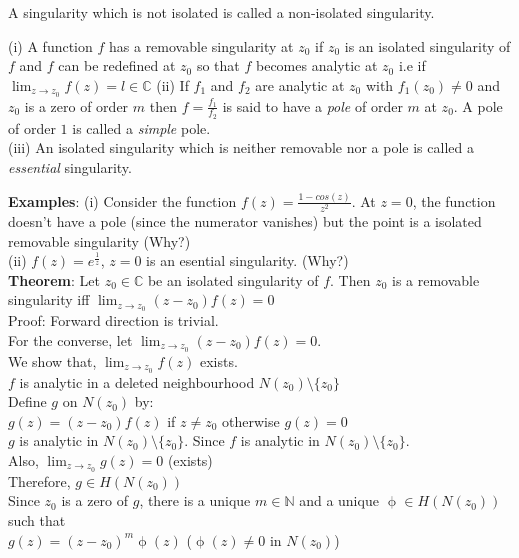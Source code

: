 A singularity which is not isolated is called a non-isolated singularity.\\
\begin{defn}
    (i) A function $f$ has a removable singularity at $z_0$ if $z_0$ is an isolated singularity of $f$ and $f$ can be redefined at $z_0$ so that $f$ becomes analytic at $z_0$ i.e if \\
    $\lim_{z\rightarrow z_0} f(z)=l\in \mathbb{C}$
    (ii)  If $f_1$ and $f_2$ are analytic at $z_0$ with $f_1(z_0)\neq 0$ and $z_0$ is a zero of order $m$ then $f=\frac{f_1}{f_2}$ is said to have a \emph{pole} of order $m$ at $z_0$. A pole of order $1$ is called a \emph{simple} pole.\\
    (iii) An isolated singularity which is neither removable nor a pole is called a \emph{essential} singularity.\\
\end{defn}
\textbf{Examples}: (i) Consider the function $f(z)= \frac{1-cos(z)}{z^2}$. At $z=0$, the function doesn't have a pole (since the numerator vanishes) but the point is a isolated removable singularity (Why?)\\
(ii) $f(z)=e^{\frac{1}{z}}$, $z=0$ is an esential singularity. (Why?)\\
\textbf{Theorem}: Let $z_0\in \mathbb{C}$ be an isolated singularity of $f$. Then $z_0$ is a removable singularity iff $\lim_{z\rightarrow z_0} (z-z_0) f(z)=0$\\
Proof: Forward direction is trivial.\\
For the converse, let $\lim_{z\rightarrow z_0} (z-z_0) f(z)=0$.\\
We show that, $\lim_{z\rightarrow z_0} f(z)$ exists.\\
$f$ is analytic in a deleted neighbourhood $N(z_0)\setminus \{z_0\}$\\
Define $g$ on $N(z_0)$ by: \\
$g(z)= (z-z_0)f(z)$ if $z\neq z_0$ otherwise $g(z)=0$\\
$g$ is analytic in $N(z_0)\setminus \{z_0\}$. Since $f$ is analytic in $N(z_0)\setminus \{z_0\}$. \\
Also, $\lim_{z\rightarrow z_0} g(z)=0$  (exists)\\
Therefore, $g\in H(N(z_0))$\\
Since $z_0$ is a zero of $g$, there is a unique $m\in \mathbb{N}$ and a unique $\upphi\in H(N(z_0))$ such that \\
$g(z)=(z-z_0)^m\upphi(z)$ ($\upphi(z)\neq 0$ in $N(z_0)$)\\
